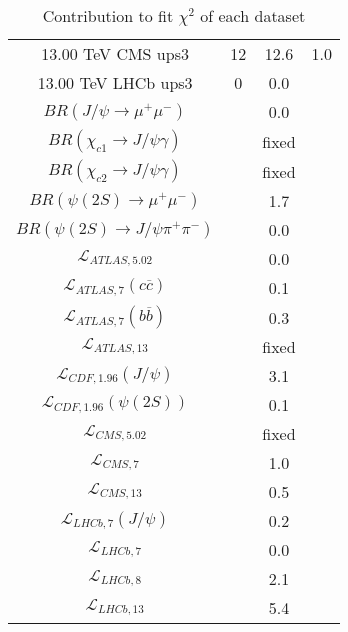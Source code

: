 \begin{table}[h!]
\begin{tabular}{c|c|c|c}
13.00 TeV CMS ups3 & 12 & 12.6 & 1.0 \\
13.00 TeV LHCb ups3 & 0 & 0.0 &  \\
\hline
$BR(J/\psi\rightarrow\mu^+\mu^-)$ &  & 0.0 &  \\
$BR(\chi_{c1}\rightarrow J/\psi\gamma)$ &  & fixed & \\
$BR(\chi_{c2}\rightarrow J/\psi\gamma)$ &  & fixed & \\
$BR(\psi(2S)\rightarrow\mu^+\mu^-)$ &  & 1.7 &  \\
$BR(\psi(2S)\rightarrow J/\psi\pi^+\pi^-)$ &  & 0.0 &  \\
$\mathcal L_{ATLAS,5.02}$ &  & 0.0 &  \\
$\mathcal L_{ATLAS,7}(c\overline c)$ &  & 0.1 &  \\
$\mathcal L_{ATLAS,7}(b\overline b)$ &  & 0.3 &  \\
$\mathcal L_{ATLAS,13}$ &  & fixed & \\
$\mathcal L_{CDF,1.96}(J/\psi)$ &  & 3.1 &  \\
$\mathcal L_{CDF,1.96}(\psi(2S))$ &  & 0.1 &  \\
$\mathcal L_{CMS,5.02}$ &  & fixed & \\
$\mathcal L_{CMS,7}$ &  & 1.0 &  \\
$\mathcal L_{CMS,13}$ &  & 0.5 &  \\
$\mathcal L_{LHCb,7}(J/\psi)$ &  & 0.2 &  \\
$\mathcal L_{LHCb,7}$ &  & 0.0 &  \\
$\mathcal L_{LHCb,8}$ &  & 2.1 &  \\
$\mathcal L_{LHCb,13}$ &  & 5.4 &  \\
\end{tabular}
\caption{Contribution to fit $\chi^2$ of each dataset}
\end{table}
